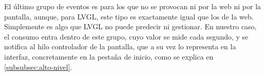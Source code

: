 El último grupo de eventos es para los que no se provocan ni por la web ni por la pantalla, aunque, para LVGL, este tipo es exactamente igual que los de la web. Simplemente es algo que LVGL no puede predecir ni gestionar. En nuestro caso, el consumo entra dentro de este grupo, cuyo valor se mide cada segundo, y se notifica al hilo controlador de la pantalla, que a su vez lo representa en la interfaz, concretamente en la pestaña de inicio, como se explica en \autoref{subsubsec:alto-nivel}.